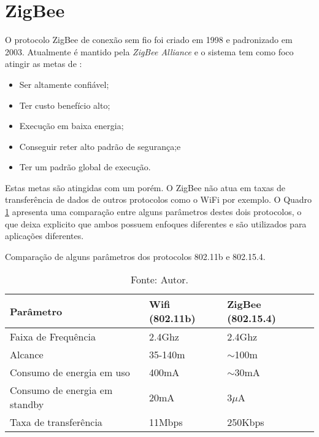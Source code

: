\section{ZigBee}
\label{sec:zigbee}
 O protocolo ZigBee de conexão sem fio foi criado em 1998 e padronizado em 2003. Atualmente é mantido pela \textit{ZigBee Alliance}\cite{zb} e o sistema tem como foco atingir as metas de \cite{gislason2008zigbee}:

 \begin{itemize}
 	\item Ser altamente confiável;
 	\item Ter custo benefício alto;
 	\item Execução em baixa energia;
 	\item Conseguir reter alto padrão de segurança;e
 	\item Ter um padrão global de execução.
 \end{itemize}

Estas metas são atingidas com um porém. O ZigBee não atua em taxas de transferência de dados de outros protocolos como o WiFi por exemplo. O Quadro \ref{tab:protocolscomparition} apresenta uma comparação entre alguns parâmetros destes dois protocolos, o que deixa explicito que ambos possuem enfoques diferentes e são utilizados para aplicações diferentes.

\begin{table}[]
\centering
\caption{Comparação de alguns parâmetros dos protocolos 802.11b e 802.15.4.}
\label{tab:protocolscomparition}
\begin{tabular}{|l|l|l|}
\hline
\rowcolor[HTML]{C0C0C0} 
\textbf{Parâmetro}            & \textbf{Wifi (802.11b)} & \textbf{ZigBee (802.15.4)} \\ \hline
Faixa de Frequência           & 2.4Ghz                  & 2.4Ghz                     \\ \hline
Alcance                       & 35-140m                 & $\sim$100m                 \\ \hline
Consumo de energia em uso     & 400mA                   & $\sim$30mA                 \\ \hline
Consumo de energia em standby & 20mA                    & 3$\mu$A                        \\ \hline
Taxa de transferência         & 11Mbps                  & 250Kbps                    \\ \hline
\end{tabular}
\caption*{Fonte: Autor.}
\end{table}

